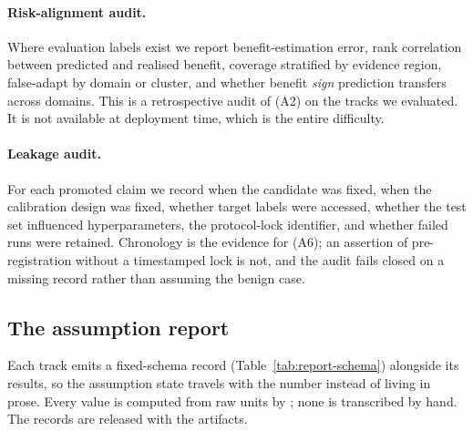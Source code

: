 \paragraph{Risk-alignment audit.} Where evaluation labels exist we report
benefit-estimation error, rank correlation between predicted and realised benefit,
coverage stratified by evidence region, false-adapt by domain or cluster, and whether
benefit \emph{sign} prediction transfers across domains. This is a retrospective audit of
(A2) on the tracks we evaluated. It is not available at deployment time, which is the
entire difficulty.

\paragraph{Leakage audit.} For each promoted claim we record when the candidate was
fixed, when the calibration design was fixed, whether target labels were accessed,
whether the test set influenced hyperparameters, the protocol-lock identifier, and
whether failed runs were retained. Chronology is the evidence for (A6); an assertion of
pre-registration without a timestamped lock is not, and the audit fails closed on a
missing record rather than assuming the benign case.

\subsection{The assumption report}\label{sec:assumption-report}

Each track emits a fixed-schema record (Table~\ref{tab:report-schema}) alongside its
results, so the assumption state travels with the number instead of living in prose.
Every value is computed from raw units by ; none is transcribed by
hand. The records are released with the artifacts.

